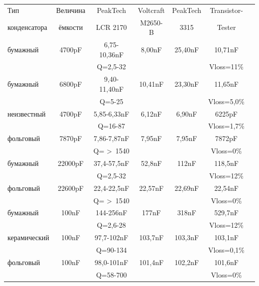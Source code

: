 \begin{tabular}{| l | c | c | c | c | c | c |}
   \hline
Тип           & Величина      & PeakTech      & Voltcraft & PeakTech & Transistor- \\
конденсатора & ёмкости & LCR 2170     & M2650-B   &  3315    & Tester      \\
    \hline
    \hline
бумажный     & 4700pF      & 6,75-10,36nF & 8,00nF    &  25,40nF & 10,71nF  \\
          &             & Q=2,5-32     &           &          & Vloss=11\% \\
    \hline
бумажный     & 6800pF      & 9,40-11,40nF & 10,41nF   &  23,30nF & 11,65nF \\
          &             & Q=5-25       &           &          & Vloss=5,0\% \\
    \hline
неизвестный  & 4700pF      & 5,85-6,33nF & 6,12nF    &  6,90nF  & 6225pF \\
           &             & Q=16-87     &           &          & Vloss=1,7\% \\
    \hline
фольговый      & 7870pF      & 7,86-7,87nF  & 7,95nF    &  7,95nF  & 7872pF \\
          &             & Q= \textgreater~1540     &           &          & Vloss=0\% \\
    \hline
бумажный     & 22000pF     & 37,4-57,5nF  & 52,8nF    &  112nF   & 118,5nF \\
          &             & Q=2,5-32     &           &          & Vloss=12\% \\
    \hline
фольговый      & 22600pF     & 22,4-22,5nF  & 22,57nF   & 22,69nF  & 22,54nF \\
          &             & Q= \textgreater~1540     &           &          & Vloss=0\% \\
    \hline
бумажный     & 100nF       & 144-256nF    & 177nF     &  318nF   & 529,7nF \\
          &             & Q=2,6-28     &           &          & Vloss=12\% \\
    \hline
керамический & 100nF       & 97,7-102nF   & 103,7nF   & 103,3nF  & 103,1nF \\
          &             & Q=90-134     &           &          & Vloss=0,1\% \\
    \hline
фольговый      & 100nF       & 98,0-101nF   & 101,4nF   & 102,2nF  & 101,6nF \\
          &             & Q=58-700     &           &          & Vloss=0\% \\
    \hline
\end{tabular}

